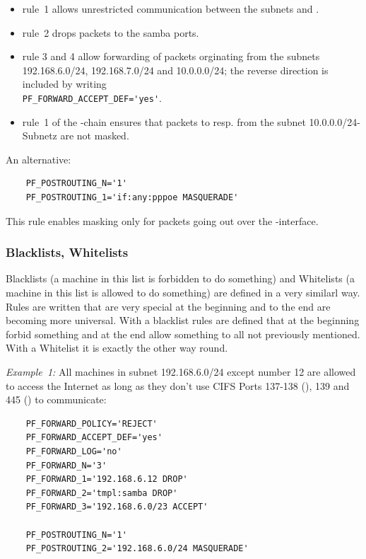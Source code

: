 \begin{itemize}
\item rule~1 allows unrestricted communication between the subnets
   and .
\item rule~2 drops packets to the samba ports.
\item rule 3 and 4 allow forwarding of packets orginating from the
  subnets 192.168.6.0/24, 192.168.7.0/24 and 10.0.0.0/24; the reverse
  direction is included by writing\\
  \verb+PF_FORWARD_ACCEPT_DEF='yes'+.
\item rule~1 of the -chain ensures that packets to
  resp. from the subnet 10.0.0.0/24-Subnetz are not masked.
\end{itemize}

An alternative:

\begin{example}
\begin{verbatim}
    PF_POSTROUTING_N='1'
    PF_POSTROUTING_1='if:any:pppoe MASQUERADE'
\end{verbatim}
\end{example}

This rule enables masking only for packets going out over the 
-interface.

\subsubsection{Blacklists, Whitelists}

Blacklists (a machine in this list is forbidden to do something) and
Whitelists (a machine in this list is allowed to do something) are
defined in a very similarl way. Rules are written that are very special at the beginning
and to the end are becoming more universal. With a blacklist rules are defined
that at the beginning forbid something and at the end allow something to
all not previously mentioned. With a Whitelist it is exactly the other way round.

\emph{Example~1:} All machines in subnet 192.168.6.0/24 except number 12
are allowed to access the Internet as long as they don't use CIFS Ports 137-138
(), 139 and 445 () to communicate:

\begin{example}
\begin{verbatim}
    PF_FORWARD_POLICY='REJECT'
    PF_FORWARD_ACCEPT_DEF='yes'
    PF_FORWARD_LOG='no'
    PF_FORWARD_N='3'
    PF_FORWARD_1='192.168.6.12 DROP'
    PF_FORWARD_2='tmpl:samba DROP'
    PF_FORWARD_3='192.168.6.0/23 ACCEPT'

    PF_POSTROUTING_N='1'
    PF_POSTROUTING_2='192.168.6.0/24 MASQUERADE'
\end{verbatim}
\end{example}

